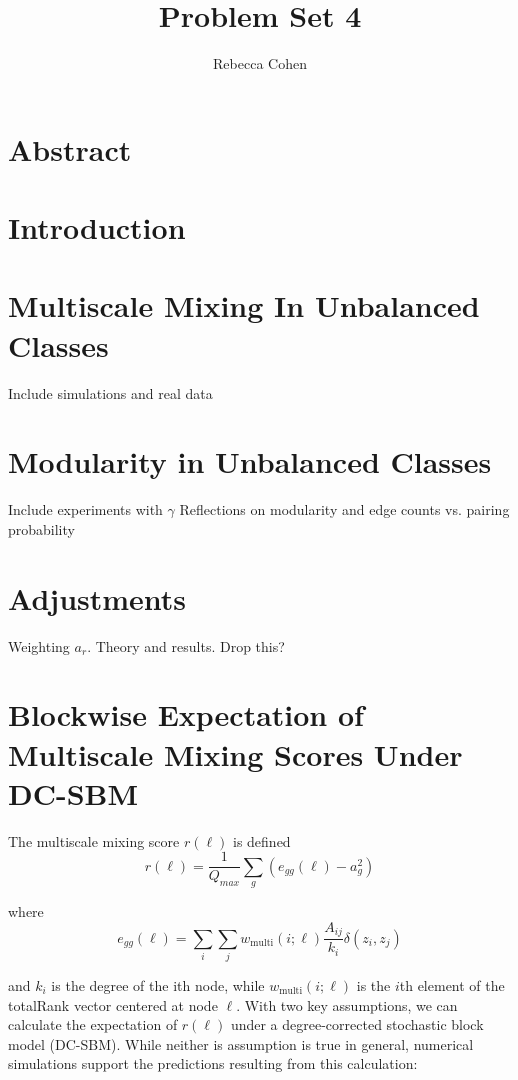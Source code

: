 \documentclass[12pt]{article}
\title{Problem Set 4}
\author{Rebecca Cohen}
\begin{document}
\maketitle
\section{Abstract}
\section{Introduction}

\section{Multiscale Mixing In Unbalanced Classes}
Include simulations and real data

\section{Modularity in Unbalanced Classes}
Include experiments with $\gamma$
Reflections on modularity and edge counts vs. pairing probability

\section{Adjustments}
Weighting $a_r$.  Theory and results.  Drop this?

\section{Blockwise Expectation of Multiscale Mixing Scores Under DC-SBM}
The multiscale mixing score $r(\ell)$ is defined
\begin{equation}
  r(\ell) = \frac{1}{Q_{max}} \sum_g (e_{gg}(\ell) - a_g^2)
\end{equation}

where 
\begin{equation}
  e_{gg}(\ell) = \sum_i \sum_j w_{\text{multi}}(i; \ell) \frac{A_{ij}}{k_i} \delta(z_i, z_j) 
\end{equation}

and $k_i$ is the degree of the ith node, while $w_{\text{multi}}(i; \ell)$ is the $i$th element of the totalRank vector centered at node $\ell$.  With two key assumptions, we can calculate the expectation of $r(\ell)$ under a degree-corrected stochastic block model (DC-SBM).  While neither is assumption is true in general, numerical simulations support the predictions resulting from this calculation:
\end{document}
